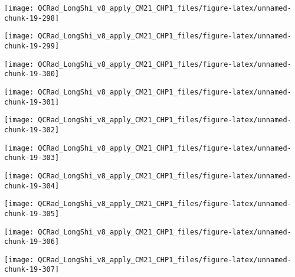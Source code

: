 \documentclass[
  10pt,
  a4paper,oneside]{article}
\begin{document}
\begin{center}\texttt{[image: QCRad\_LongShi\_v8\_apply\_CM21\_CHP1\_files/figure-latex/unnamed-chunk-19-298]} \end{center}

\begin{center}\texttt{[image: QCRad\_LongShi\_v8\_apply\_CM21\_CHP1\_files/figure-latex/unnamed-chunk-19-299]} \end{center}

\begin{center}\texttt{[image: QCRad\_LongShi\_v8\_apply\_CM21\_CHP1\_files/figure-latex/unnamed-chunk-19-300]} \end{center}

\begin{center}\texttt{[image: QCRad\_LongShi\_v8\_apply\_CM21\_CHP1\_files/figure-latex/unnamed-chunk-19-301]} \end{center}

\begin{center}\texttt{[image: QCRad\_LongShi\_v8\_apply\_CM21\_CHP1\_files/figure-latex/unnamed-chunk-19-302]} \end{center}

\begin{center}\texttt{[image: QCRad\_LongShi\_v8\_apply\_CM21\_CHP1\_files/figure-latex/unnamed-chunk-19-303]} \end{center}

\begin{center}\texttt{[image: QCRad\_LongShi\_v8\_apply\_CM21\_CHP1\_files/figure-latex/unnamed-chunk-19-304]} \end{center}

\begin{center}\texttt{[image: QCRad\_LongShi\_v8\_apply\_CM21\_CHP1\_files/figure-latex/unnamed-chunk-19-305]} \end{center}

\begin{center}\texttt{[image: QCRad\_LongShi\_v8\_apply\_CM21\_CHP1\_files/figure-latex/unnamed-chunk-19-306]} \end{center}

\begin{center}\texttt{[image: QCRad\_LongShi\_v8\_apply\_CM21\_CHP1\_files/figure-latex/unnamed-chunk-19-307]} \end{center}
\end{document}
